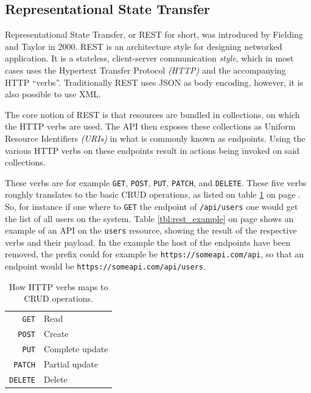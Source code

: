 		\subsection{Representational State Transfer}
			\label{sec:design:rest}
			Representational State Transfer, or REST for short, was introduced by Fielding and Taylor \cite{Fielding:2000:PDM:337180.337228} in 2000. REST is an architecture style for designing networked application. It is a stateless, client-server communication \emph{style}, which in most cases uses the Hypertext Transfer Protocol \emph{(HTTP)} and the accompanying HTTP ``verbs''. Traditionally REST uses JSON as body encoding, however, it is also possible to use XML.

			The core notion of REST is that resources are bundled in collections, on which the HTTP verbs are used. The API then exposes these collections as Uniform Resource Identifiers \emph{(URIs)} in what is commonly known as endpoints. Using the various HTTP verbs on these endpoints result in actions being invoked on said collections.

			These verbs are for example \verb=GET=, \verb=POST=, \verb=PUT=, \verb=PATCH=, and \verb=DELETE=. These five verbs roughly translates to the basic CRUD operations, as listed on table \ref{tbl:verbs} on page \pageref{tbl:verbs}. So, for instance if one where to \verb=GET= the endpoint of \verb=/api/users= one would get the list of all users on the system. Table \ref{tbl:rest_example} on page \pageref{tbl:rest_example} shows an example of an API on the \verb=users= resource, showing the result of the respective verbs and their payload. In the example the host of the endpoints have been removed, the prefix could for example be \verb=https://someapi.com/api=, so that an endpoint would be \verb=https://someapi.com/api/users=.

			\begin{table}
				\begin{tabular}{r|l}
					\verb=GET= 		& Read 				\\
					\verb=POST= 	& Create 			\\
					\verb=PUT= 		& Complete update 	\\
					\verb=PATCH= 	& Partial update 	\\
					\verb=DELETE= 	& Delete 			\\
				\end{tabular}

				\caption{How HTTP verbs maps to CRUD operations.}
				\label{tbl:verbs}

			\end{table}


